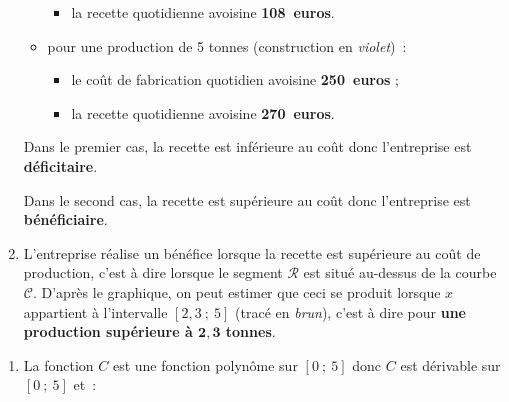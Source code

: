 \begin{corrige}
\begin{enumerate}
\begin{itemize}
\begin{itemize}[label=---]
                    \item la recette quotidienne avoisine \textbf{108~euros}.
               \end{itemize}
               \item pour une production de 5 tonnes (construction en \textit{violet})~:
               \begin{itemize}[label=---]
                    \item le coût de fabrication quotidien avoisine \textbf{250~euros} ;
                    \item la recette quotidienne avoisine \textbf{270~euros}.
               \end{itemize}
               \par
          \end{itemize}
          \par
          Dans le premier cas, la recette est inférieure au coût donc l'entreprise est \textbf{déficitaire}.
          \par
          Dans le second cas, la recette est supérieure au coût donc l'entreprise est \textbf{bénéficiaire}.
          \par
          \par
          \item L'entreprise réalise un bénéfice lorsque la recette est supérieure au coût de production, c'est à dire lorsque le segment $\mathscr{R}$ est situé au-dessus de la courbe $\mathscr{C}$.
          D'après le graphique, on peut estimer que ceci se produit lorsque $x$ appartient à l'intervalle $[2,3~;~5]$ (tracé en \textit{brun}), c'est à dire pour \textbf{une production supérieure à $\bm{2,3}$ tonnes}.
          \par
     \end{enumerate}
     \par
     \par
     \begin{enumerate}
          \item La fonction $C$ est une fonction polynôme sur $[0~;~5]$ donc $C$ est dérivable sur $[0~;~5]$ et~:

\end{enumerate}
\end{corrige}
